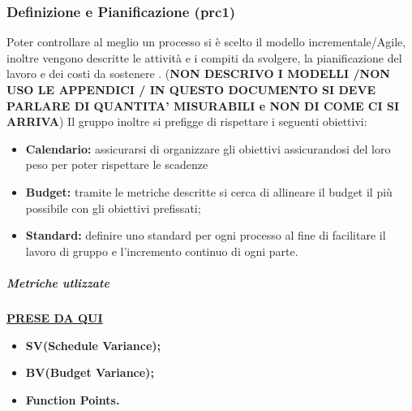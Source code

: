 \subsubsection{Definizione e Pianificazione (prc1)}
Poter controllare al meglio un processo si è scelto il modello incrementale/Agile, inoltre vengono descritte le attività e i compiti da svolgere, la pianificazione del lavoro e dei costi da sostenere . (\textbf{NON DESCRIVO I MODELLI /NON USO LE APPENDICI / IN QUESTO DOCUMENTO SI DEVE PARLARE DI QUANTITA' MISURABILI e NON DI COME CI SI ARRIVA}) Il gruppo inoltre si prefigge di rispettare i seguenti obiettivi:
\begin{itemize}
		\item{\textbf{Calendario:} assicurarsi di organizzare gli obiettivi assicurandosi del loro peso per poter rispettare le scadenze}
		\item{\textbf{Budget:} tramite le metriche descritte si cerca di allineare il budget il più possibile con gli obiettivi prefissati;}
		\item{\textbf{Standard:} definire uno standard per ogni processo al fine di facilitare il lavoro di gruppo e l'incremento continuo di ogni parte.}
\end{itemize} 
\subparagraph{Metriche utlizzate}
\href{https://it.wikipedia.org/wiki/Metriche_di_progetto}{\textbf{PRESE DA QUI}}
\begin{itemize}
	\item{\textbf{SV(Schedule Variance);}}
	\item{\textbf{BV(Budget Variance);}}
	\item{\textbf{Function Points.} }
\end{itemize}
\begin{table}[!htpb]
\end{table}

